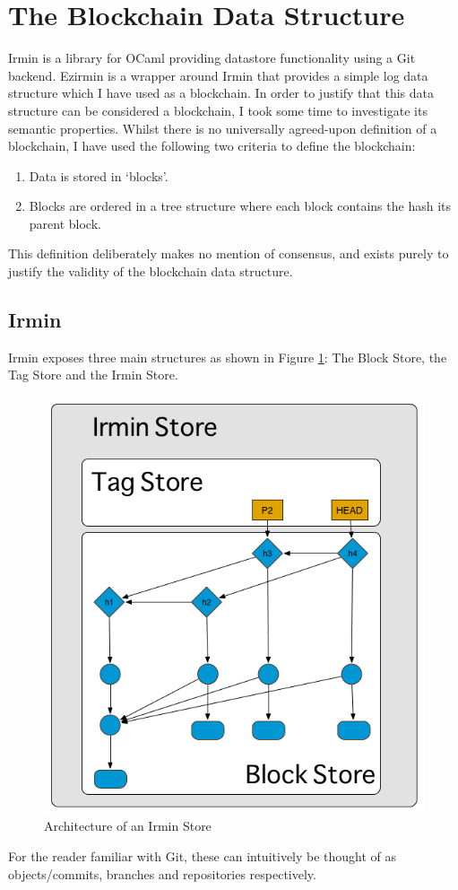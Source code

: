 \documentclass[12pt,a4paper,twoside,openright]{report}
\begin{document}
	\section{The Blockchain Data Structure}\label{sec:datastructure}
	Irmin  \cite{Irmin} is a library for OCaml providing datastore functionality using a Git backend.
	Ezirmin is a wrapper around Irmin that provides a simple log data structure which I have used as a blockchain.
	In order to justify that this data structure can be considered a blockchain, I took some time to investigate its semantic properties. 
	Whilst there is no universally agreed-upon definition of a blockchain, I have used the following two criteria to define the blockchain:
	\begin{enumerate}
		\item Data is stored in `blocks'.
		\item Blocks are ordered in a tree structure where each block contains the hash its parent block.
	\end{enumerate}
	This definition deliberately makes no mention of consensus, and exists purely to justify the validity of the blockchain data structure.
	\subsection{Irmin}
	Irmin exposes three main structures as shown in Figure \ref{fig:IrminBlockStore}: The Block Store, the Tag Store and the Irmin Store.
	\begin{figure}
		\begin{center}
		\includegraphics[width=13cm]{figs/irmin-stores.png}
		\caption{Architecture of an Irmin Store}
		\label{fig:IrminBlockStore}
		\end{center}
	\end{figure}
	For the reader familiar with Git, these can intuitively be thought of as objects/commits, branches and repositories respectively.
\end{document}
